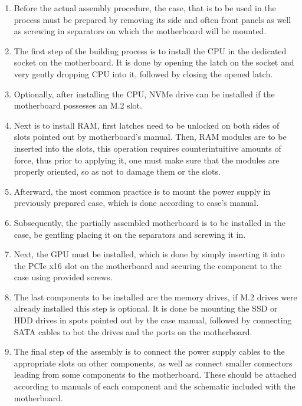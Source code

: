 \begin{enumerate}
	\item Before the actual assembly procedure, the case, that is to be used in the process must be prepared by removing its side and often front panels as well as screwing in separators on which the motherboard will be mounted.
	\item The first step of the building process is to install the CPU in the dedicated socket on the motherboard.
	It is done by opening the latch on the socket and very gently dropping CPU into it, followed by closing the opened latch.
	\item Optionally, after installing the CPU, NVMe drive can be installed if the motherboard possesses an M.2 slot.
	\item Next is to install RAM, first latches need to be unlocked on both sides of slots pointed out by motherboard's manual.
	Then, RAM modules are to be inserted into the slots, this operation requires counterintuitive amounts of force, thus prior to applying it, one must make sure that the modules are properly oriented, so as not to damage them or the slots.
	\item Afterward, the most common practice is to mount the power supply in previously prepared case, which is done according to case's manual.
	\item Subsequently, the partially assembled motherboard is to be installed in the case, be gentling placing it on the separators and screwing it in. 
	\item Next, the GPU must be installed, which is done by simply inserting it into the PCIe x16 slot on the motherboard and securing the component to the case using provided screws.
	\item The last components to be installed are the memory drives, if M.2 drives were already installed this step is optional.
	It is done be mounting the SSD or HDD drives in spots pointed out by the case manual, followed by connecting SATA cables to bot the drives and the ports on the motherboard.
	\item The final step of the assembly is to connect the power supply cables to the appropriate slots on other components, as well as connect smaller connectors leading from some components to the motherboard.
	These should be attached according to manuals of each component and the schematic included with the motherboard.
\end{enumerate}

